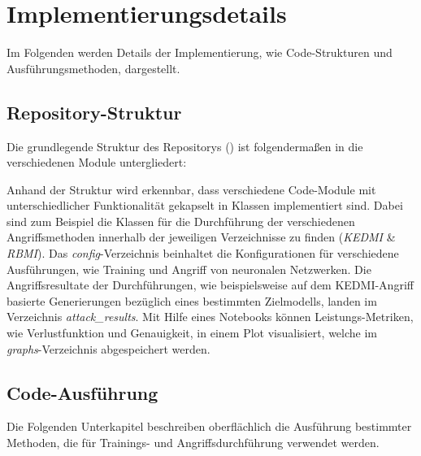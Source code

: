 \section{Implementierungsdetails} \label{chpt:Implementierung_Details}
Im Folgenden werden Details der Implementierung, wie Code-Strukturen und Ausführungsmethoden, dargestellt.
\subsection{Repository-Struktur}
Die grundlegende Struktur des Repositorys (\cite{weber_hosthansba_code_2024}) ist folgendermaßen in die verschiedenen Module untergliedert:

Anhand der Struktur wird erkennbar, dass verschiedene Code-Module mit unterschiedlicher Funktionalität gekapselt in Klassen implementiert sind. Dabei sind zum Beispiel die Klassen für die Durchführung der verschiedenen Angriffsmethoden innerhalb der jeweiligen Verzeichnisse zu finden (\textit{KEDMI} \& \textit{RBMI}). Das \textit{config}-Verzeichnis beinhaltet die Konfigurationen für verschiedene Ausführungen, wie Training und Angriff von neuronalen Netzwerken. Die Angriffsresultate der Durchführungen, wie beispielsweise auf dem KEDMI-Angriff basierte Generierungen bezüglich eines bestimmten Zielmodells, landen im Verzeichnis \textit{attack\_results}. Mit Hilfe eines Notebooks können Leistungs-Metriken, wie Verlustfunktion und Genauigkeit, in einem Plot visualisiert, welche im \textit{graphs}-Verzeichnis abgespeichert werden.


\subsection{Code-Ausführung}
Die Folgenden Unterkapitel beschreiben oberflächlich die Ausführung bestimmter Methoden, die für Trainings- und Angriffsdurchführung verwendet werden.

